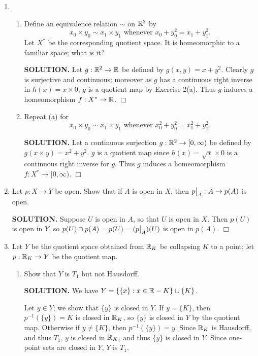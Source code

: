 \documentclass{article}
\begin{document}
\begin{enumerate}
    \item 
    \begin{enumerate}
        \item Define an equivalence relation $\sim$ on $\mathbb{R}^2$ by
        $$x_0 \times y_0 \sim x_1 \times y_1 \text{ whenever } x_0 + y_0^2 = x_1 + y_1^2.$$
        Let $X^*$ be the corresponding quotient space. It is homeomorphic to a familiar space; what is it?
    
        {\bf SOLUTION.} Let $g: \mathbb{R}^2 \rightarrow \mathbb{R}$ be defined by $g(x, y) = x+y^2$. Clearly $g$ is surjective and continuous; moreover as $g$ has a continuous right inverse in $h(x) = x \times 0$, $g$ is a quotient map by Exercise 2(a). Thus $g$ induces a homeomorphism $f: X^* \rightarrow \mathbb{R}$. $\Box$

        \item Repeat (a) for
        $$x_0 \times y_0 \sim x_1 \times y_1 \text{ whenever } x_0^2 + y_0^2 = x_1^2 + y_1^2.$$

        {\bf SOLUTION.} Let a continuous surjection $g: \mathbb{R}^2 \rightarrow [0, \infty)$ be defined by $g(x \times y) = x^2 + y^2$. $g$ is a quotient map since $h(x) = \sqrt{x} \times 0$ is a continuous right inverse for $g$. Thus $g$ induces a homeomorphism $f: X^* \rightarrow [0, \infty)$. $\Box$

    \end{enumerate}

    \item Let $p: X \rightarrow Y$ be open. Show that if $A$ is open in $X$, then $\restr{p}{A}: A \rightarrow p(A)$ is open.

    {\bf SOLUTION.} Suppose $U$ is open in $A$, so that $U$ is open in $X$. Then $p(U)$ is open in $Y$, so $p(U) \cap p(A) = p(U) = (\restr{p}{A})(U)$ is open in $p(A)$. $\Box$

    \item Let $Y$ be the quotient space obtained from $\mathbb{R}_K$ be collapsing $K$ to a point; let $p: \mathbb{R}_K \rightarrow Y$ be the quotient map.

    \begin{enumerate}
        \item Show that $Y$ is $T_1$ but not Hausdorff.

        {\bf SOLUTION.} We have $Y = \{\{x\}: x \in \mathbb{R} - K\} \cup \{K\}$.
        
        Let $y \in Y$; we show that $\{y\}$ is closed in $Y$. If $y = \{K\}$, then $p^{-1}(\{y\}) = K$ is closed in $\mathbb{R}_K$, so $\{y\}$ is closed in $Y$ by the quotient map. Otherwise if $y \neq \{K\}$, then $p^{-1}(\{y\}) = y$. Since $\mathbb{R}_K$ is Hausdorff, and thus $T_1$, $y$ is closed in $\mathbb{R}_K$, and thus $\{y\}$ is closed in $Y$. Since one-point sets are closed in $Y$, $Y$ is $T_1$.


\end{enumerate}
\end{enumerate}
\end{document}
